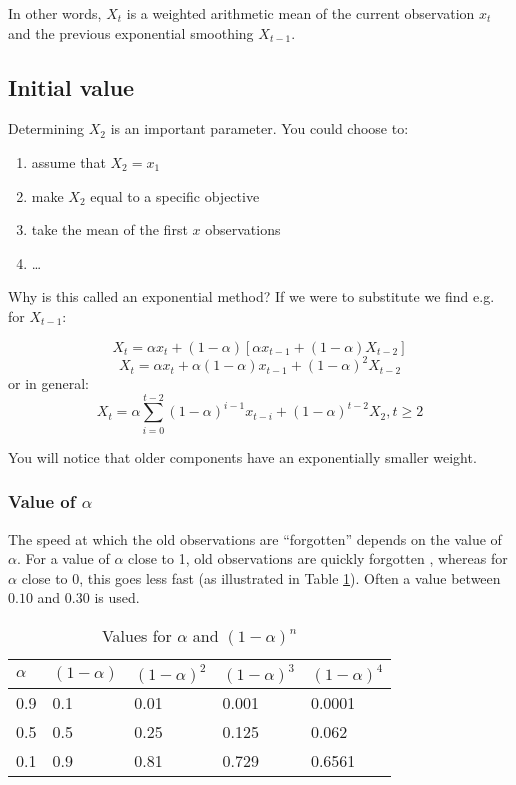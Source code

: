 In other words, $X_{t}$ is a weighted arithmetic mean of the current observation $x_t$ and the previous exponential smoothing $X_{t-1}$.

\subsection{Initial value}
Determining $X_{2}$ is an important parameter. You could choose to:
\begin{enumerate}
  \item assume that $X_{2} = x_{1}$
  \item make $X_{2}$ equal to a specific objective
  \item take the mean of the first $x$ observations
  \item \dots
\end{enumerate}

Why is this called an exponential method? If we were to substitute we find e.g. for $X_{t-1}$:

\[ X_{t} = \alpha x_{t} + (1-\alpha)\left[\alpha x_{t-1} + (1-\alpha)X_{t-2}\right] \] 
\[ X_{t} = \alpha x_{t} + \alpha (1-\alpha)x_{t-1} + (1-\alpha)^{2} X_{t-2} \]
or in general:
\[ X_{t} = \alpha \sum_{i=0}^{t-2}(1-\alpha)^{i-1}x_{t-i} + (1-\alpha)^{t-2} X_{2}, t \geq 2 \]

You will notice that older components have an exponentially smaller weight.

\subsubsection{Value of $\alpha$}
The speed at which the old observations are ``forgotten'' depends on the value of $\alpha$. For a value of $\alpha$ close to 1, old observations are quickly forgotten , whereas for  $\alpha$ close to 0, this goes less fast (as illustrated in Table \ref{tab:alpha}). Often a value between $0.10$ and $0.30$ is used.

\begin{table}
  \centering
  \begin{tabular}{l|llll}
  $\alpha$ & $(1-\alpha)$ & $(1-\alpha)^{2}$ & $(1-\alpha)^{3}$ & $(1-\alpha)^{4}$ \\ \hline
  0.9   & 0.1       & 0.01             & 0.001                      & 0.0001           \\
  0.5   & 0.5       & 0.25             & 0.125                      & 0.062            \\
  0.1   & 0.9       & 0.81             & 0.729                      & 0.6561           \\
  \end{tabular}
  \caption{Values for $\alpha$ and $(1-\alpha)^{n}$}
  \label{tab:alpha}
  \end{table}

